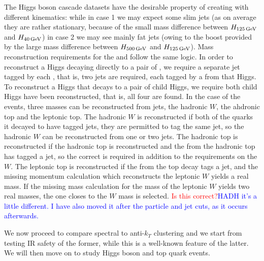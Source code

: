     The Higgs boson cascade datasets have the desirable property of creating  with different kinematics: while in case 1 we may expect some slim  jets (as on average they are rather stationary, because of the small mass difference between $H_{125\,{\rm GeV}}$ and $H_{40\,{\rm GeV}}$)
in case 2 we may see mainly fat jets (owing to the boost provided by the large mass difference between $H_{500\,{\rm GeV}}$ and $H_{125\,{\rm GeV}}$).
Mass reconstruction requirements for the  and  follow the same logic.
In order to reconstruct a Higgs decaying directly to a pair of , we require a separate jet tagged by each , that is, two jets are required, each tagged by a  from that Higgs.
To reconstruct a Higgs that decays to a pair of child Higgs, we require both child Higgs have been reconstructed, that is, all four  are found.
In the case of the  events, three masses can be reconstructed from jets, the hadronic \(W\), the ahdronic top and the leptonic top.
The hadronic \(W\) is reconstructed if both of the quarks it decayed to have tagged jets, they are permitted to tag the same jet, so the hadronic \(W\) can be reconstructed from one or two jets.
The hadronic top is reconstructed if the hadronic top is reconstructed and the  from the hadronic top has tagged a jet, so the correct  is required in addition to the requirements on the \(W\).
The leptonic top is reconstructed if the  from the top decay tags a jet, and the missing momentum calculation which reconstructs the leptonic \(W\) yields a real mass.
If the missing mass calculation for the mass of the leptonic \(W\) yields two real masses, the one closes to the \(W\) mass is selected.
{\textcolor{red}{Is this correct?}\textcolor{blue}{HADH it's a little different. I have also moved it after the particle and jet cuts, as it occurs afterwards.}}

We now proceed to compare spectral to anti-$k_T$ clustering and we start from testing IR safety of the former, while this is a well-known feature of the latter. We will then move on to study Higgs boson and top quark events.

